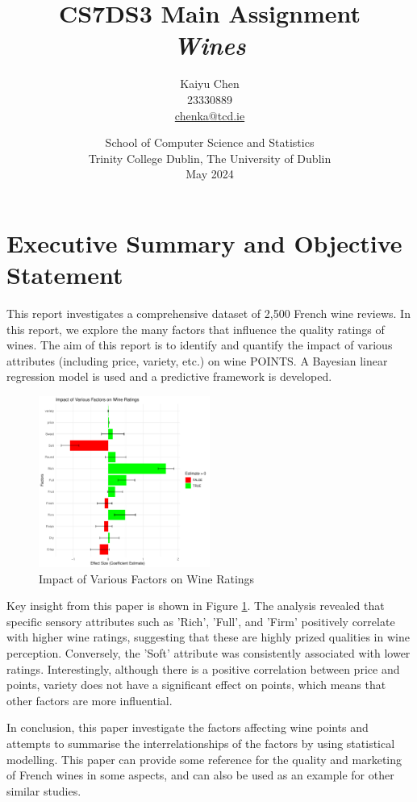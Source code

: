 \documentclass{article}
\title{CS7DS3 Main Assignment\\[1ex] 
\textit{Wines}}
\author{Kaiyu Chen\\23330889\\\href{mailto:chenka@tcd.ie}{chenka@tcd.ie}}
\date{%
        School of Computer Science and Statistics\\%
        Trinity College Dublin, The University of Dublin\\%
        May 2024
    }
\begin{document}
\maketitle
\renewcommand{\contentsname}{Table of Contents}
\tableofcontents
\thispagestyle{empty}
\newpage
{}

\section{Executive Summary and Objective Statement}\label{sec:execsummary}
This report investigates a comprehensive dataset of 2,500 French wine reviews. In this report, we explore the many factors that influence the quality ratings of wines. The aim of this report is to identify and quantify the impact of various attributes (including price, variety, etc.) on wine POINTS. A Bayesian linear regression model is used and a predictive framework is developed.


\begin{figure}[htbp]
	\centering
	\includegraphics[width=0.5\textwidth]{imgs/Impact_box.pdf}
	\caption{Impact of Various Factors on Wine Ratings}
	\label{fig:impacts}
\end{figure}

Key insight from this paper is shown in Figure \ref{fig:impacts}. The analysis revealed that specific sensory attributes such as 'Rich', 'Full', and 'Firm' positively correlate with higher wine ratings, suggesting that these are highly prized qualities in wine perception. Conversely, the 'Soft' attribute was consistently associated with lower ratings. Interestingly, although there is a positive correlation between price and points, variety does not have a significant effect on points, which means that other factors are more influential.

In conclusion, this paper investigate the factors affecting wine points and attempts to summarise the interrelationships of the factors by using statistical modelling. This paper can provide some reference for the quality and marketing of French wines in some aspects, and can also be used as an example for other similar studies.
\end{document}
